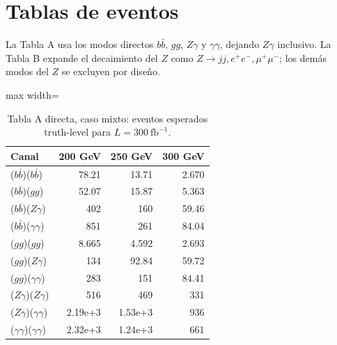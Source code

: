 \documentclass[10pt]{article}
\begin{document}
\section{Tablas de eventos}

La Tabla A usa los modos directos $b\bar b$, $gg$, $Z\gamma$ y $\gamma\gamma$, dejando $Z\gamma$ inclusivo. La Tabla B expande el decaimiento del $Z$ como $Z\to jj,e^+e^-,\mu^+\mu^-$; los demás modos del $Z$ se excluyen por diseño.

\begin{table}[H]
\centering
\small
\caption{Tabla A directa, caso mixto: eventos esperados truth-level para $L=300~\mathrm{fb}^{-1}$.}
\label{tab:A_mixto}
\begin{adjustbox}{max width=\textwidth}
\begin{tabular}{lrrr}
\toprule
Canal & 200 GeV & 250 GeV & 300 GeV \\
\midrule
($b\bar b$)($b\bar b$) & 78.21 & 13.71 & 2.670 \\
($b\bar b$)($gg$) & 52.07 & 15.87 & 5.363 \\
($b\bar b$)($Z\gamma$) & 402 & 160 & 59.46 \\
($b\bar b$)($\gamma\gamma$) & 851 & 261 & 84.04 \\
($gg$)($gg$) & 8.665 & 4.592 & 2.693 \\
($gg$)($Z\gamma$) & 134 & 92.84 & 59.72 \\
($gg$)($\gamma\gamma$) & 283 & 151 & 84.41 \\
($Z\gamma$)($Z\gamma$) & 516 & 469 & 331 \\
($Z\gamma$)($\gamma\gamma$) & 2.19e+3 & 1.53e+3 & 936 \\
($\gamma\gamma$)($\gamma\gamma$) & 2.32e+3 & 1.24e+3 & 661 \\
\bottomrule
\end{tabular}
\end{adjustbox}
\end{table}
\end{document}
